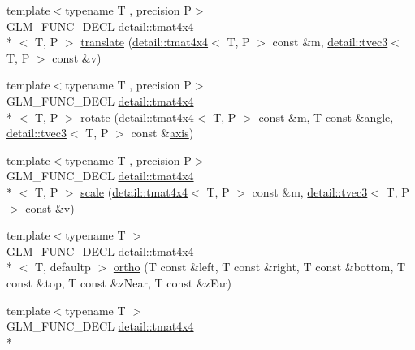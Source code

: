 \begin{DoxyCompactItemize}
\item 
{\footnotesize template$<$typename T , precision P$>$ }\\G\-L\-M\-\_\-\-F\-U\-N\-C\-\_\-\-D\-E\-C\-L \hyperlink{structglm_1_1detail_1_1tmat4x4}{detail\-::tmat4x4}\\*
$<$ T, P $>$ \hyperlink{group__gtc__matrix__transform_ga1501de0fa580dcc491b67e0685bbc7c2}{translate} (\hyperlink{structglm_1_1detail_1_1tmat4x4}{detail\-::tmat4x4}$<$ T, P $>$ const \&m, \hyperlink{structglm_1_1detail_1_1tvec3}{detail\-::tvec3}$<$ T, P $>$ const \&v)
\item 
{\footnotesize template$<$typename T , precision P$>$ }\\G\-L\-M\-\_\-\-F\-U\-N\-C\-\_\-\-D\-E\-C\-L \hyperlink{structglm_1_1detail_1_1tmat4x4}{detail\-::tmat4x4}\\*
$<$ T, P $>$ \hyperlink{group__gtc__matrix__transform_ga61e65a3bb227c267d1a15113d1056fb1}{rotate} (\hyperlink{structglm_1_1detail_1_1tmat4x4}{detail\-::tmat4x4}$<$ T, P $>$ const \&m, T const \&\hyperlink{group__gtc__quaternion_ga23a3fc7ada5bbb665ff84c92c6e0542c}{angle}, \hyperlink{structglm_1_1detail_1_1tvec3}{detail\-::tvec3}$<$ T, P $>$ const \&\hyperlink{group__gtc__quaternion_ga8eef9f8c3f2e4836dccf09df975b20fb}{axis})
\item 
{\footnotesize template$<$typename T , precision P$>$ }\\G\-L\-M\-\_\-\-F\-U\-N\-C\-\_\-\-D\-E\-C\-L \hyperlink{structglm_1_1detail_1_1tmat4x4}{detail\-::tmat4x4}\\*
$<$ T, P $>$ \hyperlink{group__gtc__matrix__transform_gabd40959f269abd16c256a4f59ab03d62}{scale} (\hyperlink{structglm_1_1detail_1_1tmat4x4}{detail\-::tmat4x4}$<$ T, P $>$ const \&m, \hyperlink{structglm_1_1detail_1_1tvec3}{detail\-::tvec3}$<$ T, P $>$ const \&v)
\item 
{\footnotesize template$<$typename T $>$ }\\G\-L\-M\-\_\-\-F\-U\-N\-C\-\_\-\-D\-E\-C\-L \hyperlink{structglm_1_1detail_1_1tmat4x4}{detail\-::tmat4x4}\\*
$<$ T, defaultp $>$ \hyperlink{group__gtc__matrix__transform_gac393e9262776e4980731c386123e4377}{ortho} (T const \&left, T const \&right, T const \&bottom, T const \&top, T const \&z\-Near, T const \&z\-Far)
\item 
{\footnotesize template$<$typename T $>$ }\\G\-L\-M\-\_\-\-F\-U\-N\-C\-\_\-\-D\-E\-C\-L \hyperlink{structglm_1_1detail_1_1tmat4x4}{detail\-::tmat4x4}\\*

\end{DoxyCompactItemize}

